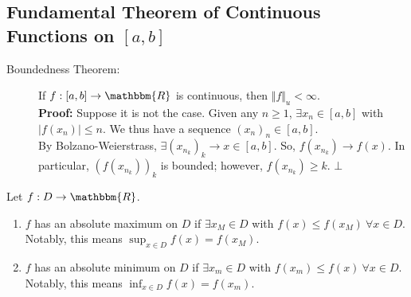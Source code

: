 \documentclass[10pt]{extarticle}
\newcommand{\R}{\mathbbm{R}}
\begin{document}
  \subsection{Fundamental Theorem of Continuous Functions on $[a,b]$}%
    \begin{description}
      \item[Boundedness Theorem:] If $f: [a,b] \rightarrow \R$ is continuous, then $\Vert f \Vert_{u} < \infty$.\\

        \textbf{Proof:} Suppose it is not the case. Given any $n\geq 1$, $\exists x_n\in [a,b]$ with $|f(x_n)|\leq n$. We thus have a sequence $(x_n)_n\in [a,b]$.\\

        By Bolzano-Weierstrass, $\exists (x_{n_k})_k \rightarrow x\in [a,b]$. So, $f(x_{n_k})\rightarrow f(x)$. In particular, $(f(x_{n_k}))_k$ is bounded; however, $f(x_{n_k})\geq k$. $\bot$
    \end{description}
    Let $f: D\rightarrow \R$.
    \begin{enumerate}[(1)]
      \item $f$ has an absolute maximum on $D$ if $\exists x_M\in D$ with $f(x) \leq f(x_M)~\forall x\in D$. Notably, this means $\sup_{x\in D}f(x) = f(x_M)$.
      \item $f$ has an absolute minimum on $D$ if $\exists x_m\in D$ with $f(x_m)\leq f(x)~\forall x\in D$. Notably, this means $\inf_{x\in D} f(x) = f(x_m)$.
    \end{enumerate}
\end{document}
